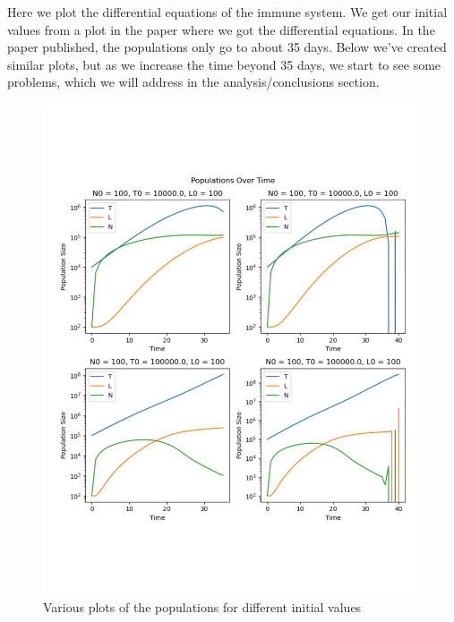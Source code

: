 \documentclass[11pt]{amsart}
\begin{document}
Here we plot the differential equations of the immune system. 
We get our initial values from a plot in the paper where we got the differential equations. 
In the paper published, the populations only go to about 35 days. 
Below we've created similar plots, but as we increase the time beyond 35 days, 
we start to see some problems, which we will address in the analysis/conclusions section.

\begin{figure}[H]
\begin{center} %
\includegraphics[scale=.6]{./images/forward_immune.pdf} %
\end{center}
\caption{Various plots of the populations for different initial values}
\label{fig:forward} %
\end{figure}

\end{document}
